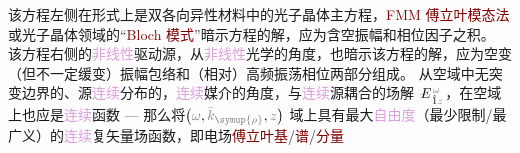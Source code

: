 {\one} 该方程左侧在形式上是\textcolor{PineGreen}{双各向异性}材料\cite{berryOpticalSingularitiesBianisotropic2005,changWavePropagationBianisotropic2014}中的光子晶体主方程\cite{sakodaOpticalPropertiesPhotonic2005,joannopoulosPhotonicCrystalsMolding2008}，\textcolor{Maroon}{FMM} \textcolor{Maroon}{傅立叶模态法}或光子晶体领域的“\textcolor{Maroon}{Bloch 模式}”暗示方程的解，应为含空\textcolor{NavyBlue}{振幅}和\textcolor{NavyBlue}{相位}因子之积。{\two} 该方程右侧的\textcolor{Plum}{非线性}\textcolor{NavyBlue}{驱动源}，从\textcolor{Plum}{非线性}\textcolor{NavyBlue}{光学}的角度，也暗示该方程的解，应为空变（但不一定缓变）\textcolor{NavyBlue}{振幅}包络和（相对）高频振荡\textcolor{NavyBlue}{相位}两部分组成\cite{boydNonlinearOptics2019}。{\three} 从空域中无突变边界的、源\textcolor{Plum}{连续}分布的，\textcolor{Plum}{连续}媒介的角度，与\textcolor{Plum}{连续}源耦合的场解 $\Xint{\mathcolor{gray}{-}}{25}{E}^{\;\!\mathcolor{gray}{\omega}}_{\;\! \hat{1} \mathcolor{gray}{z}}$，在空域上也应是\textcolor{Plum}{连续}函数 --- 那么将$\left( \mathcolor{gray}{\omega}, \mathcolor{gray}{\bar{k}_{\symup{\rho}}}, \mathcolor{gray}{z} \right)$ 域上具有最大\textcolor{Plum}{自由度}（最少限制/最广义）的\textcolor{Plum}{连续}复矢量场函数，即电场\textcolor{Maroon}{傅立叶基}/\textcolor{Maroon}{谱}/\textcolor{Maroon}{分量}

